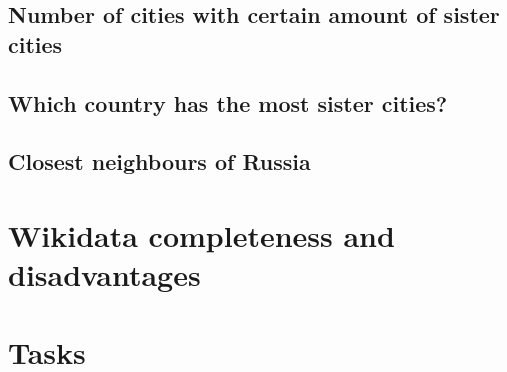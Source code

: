 \subsection{Number of cities with certain amount of sister cities}
\subsection{Which country has the most sister cities?}
\subsection{Closest neighbours of Russia}

\section{Wikidata completeness and disadvantages}

\section{Tasks}